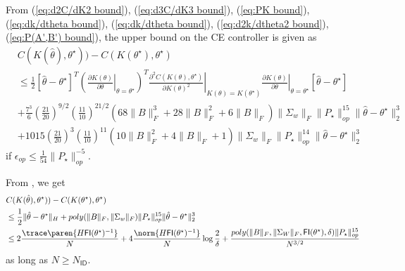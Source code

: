 From (\ref{eq:d2C/dK2 bound}), (\ref{eq:d3C/dK3 bound}), (\ref{eq:PK bound}),(\ref{eq:dk/dtheta bound}), (\ref{eq:dk/dtheta bound}), (\ref{eq:d2k/dtheta2 bound}), (\ref{eq:P(A',B') bound}), the upper bound on the CE controller is given as
\begin{align*}
    &C(K(\hat{\theta}), \theta^\star)) - C(K(\theta^\star), \theta^\star) \\ 
    &\leq \frac{1}{2}
    [\hat\theta - \theta^\star]^T\left(\left.\frac{\partial K(\theta)}{\partial \theta}\right|_{\theta = \theta^\star}\right)^T
    \left.\frac{\partial^2 C(K(\theta), \theta^\star)}{\partial K(\theta)^2}\right|_{K(\theta) = K(\theta^\star)}
    \left.\frac{\partial K(\theta)}{\partial \theta}\right|_{\theta = \theta^\star}
    [\hat{\theta} - \theta^\star] \\
    &+\frac{7^3}{6}\left(\frac{21}{20}\right)^{9/2}\left(\frac{11}{10}\right)^{21/2}(68\|B\|_F^3 + 28\|B\|_F^2 + 6\|B\|_F)\|\Sigma_w\|_F\|P_\star\|^{15}_{op}\|\hat\theta - \theta^\star\|_2^3 \\
    &+1015\left(\frac{21}{20}\right)^3\left(\frac{11}{10}\right)^{11}(10\|B\|_F^2 + 4\|B\|_F + 1)\|\Sigma_w\|_F\|P_\star\|^{14}_{op}\|\hat\theta - \theta^\star\|_2^3
\end{align*}
if $\epsilon_{op}\leq\frac{1}{54}\|P_\star\|_{op}^{-5}$.

From , we get
\begin{align*}
    &C(K(\hat{\theta}), \theta^\star)) - C(K(\theta^\star), \theta^\star) \\ 
    &\leq \frac{1}{2}\|\hat{\theta} - \theta^\star\|_H + 
    poly(\|B\|_F, \|\Sigma_w\|_F)\|P_\star\|^{15}_{op}\|\hat\theta - \theta^\star\|^3_2
    \\
    &\leq 2 \frac{\trace\paren{H \mathsf{FI}(\theta^\star)^{-1}}}{N} + 4 \frac{\norm{H \mathsf{FI}(\theta^\star)^{-1}}}{N} \log\frac{2}{\delta} 
    + \frac{poly(\|B\|_F, \|\Sigma_W\|_F, \mathsf{FI}(\theta^\star), \delta)\|P_\star\|^{15}_{op}}{N^{3/2}}
\end{align*}
as long as $N \geq N_{\mathsf{ID}}$. 

